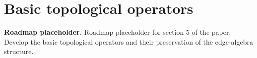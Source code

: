 \chapter{Basic topological operators}

\noindent\textbf{Roadmap placeholder.}
Roadmap placeholder for section 5 of the paper. Develop the basic topological
operators and their preservation of the edge-algebra structure.
